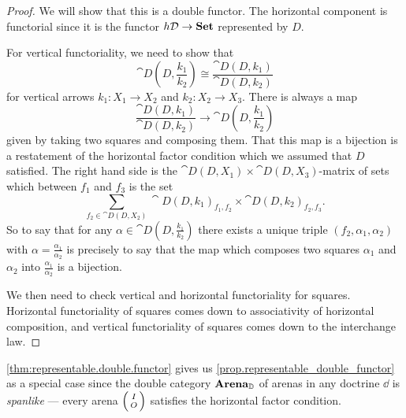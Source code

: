 \documentclass[DynamicalBook]{subfiles}
\begin{document}
\begin{proof}
We will show that this is a double functor. The horizontal component is
functorial since it is the functor $h\mathcal{D} \to \textbf{Set}$ represented by $D$. 

For vertical functoriality, we need to show that
$$\cat{D}\left( D, \frac{k_1}{k_2} \right) \cong \frac{\cat{D}(D,
  k_1)}{\cat{D}(D, k_2)}$$
for vertical arrows $k_1 : X_1 \to X_2$ and $k_2 : X_2 \to X_3$. There is always
a map
$$\frac{\cat{D}(D,
  k_1)}{\cat{D}(D, k_2)} \to \cat{D}\left( D, \frac{k_1}{k_2} \right)$$
given by taking two squares and composing them. That this map is a
bijection is a restatement of the horizontal factor condition which we assumed
that $D$ satisfied. The right hand side is the $\cat{D}(D, X_1) \times
\cat{D}(D, X_3)$-matrix of sets which between $f_1$ and $f_3$ is the set
$$\sum_{f_2 \in \cat{D}(D, X_2)} \cat{D}(D, k_1)_{f_1, f_2} \times \cat{D}(D,
k_2)_{f_2, f_3}.$$
So to say that for any $\alpha \in \cat{D}\left( D,  \frac{k_1}{k_2} \right)$
there exists a unique triple $(f_2, \alpha_1, \alpha_2)$ with $\alpha =
\frac{\alpha_1}{\alpha_2}$ is precisely to say that the map which composes two
squares $\alpha_1$ and $\alpha_2$ into $\frac{\alpha_1}{\alpha_2}$ is a bijection.

We then need to check vertical and horizontal functoriality for squares.
Horizontal functoriality of squares comes down to associativity of horizontal
composition, and vertical functoriality of squares comes down to the interchange law.
\end{proof}

\cref{thm:representable.double.functor} gives us
\cref{prop.representable_double_functor} as a special case since the double
category $\textbf{Arena}_{\mathbb{D}}$ of arenas in any doctrine $\dd$ is \emph{spanlike} --- every arena
$\lens{I}{O}$ satisfies the horizontal factor condition.
\end{document}
